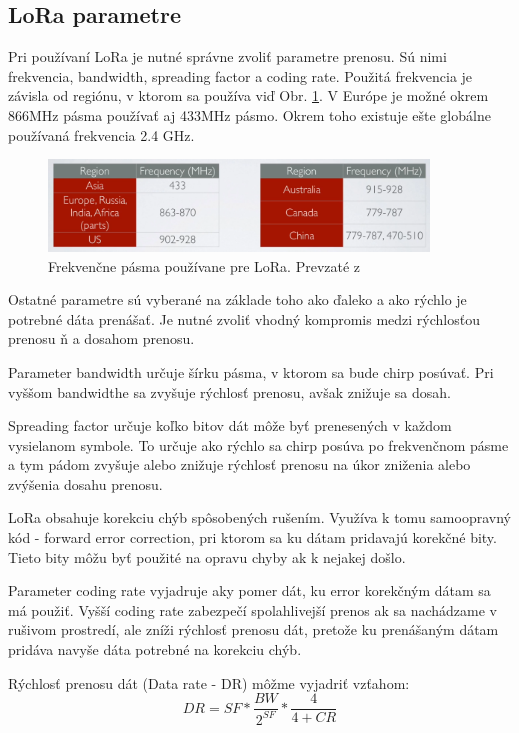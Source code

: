 \documentclass[slovak,master]{diploma}
\begin{document}
\subsection{LoRa parametre}
Pri používaní LoRa je nutné správne zvoliť parametre prenosu. Sú nimi frekvencia, bandwidth, spreading factor a coding rate.
Použitá frekvencia je závisla od regiónu, v ktorom sa používa viď Obr. \ref{fig:ismBands}. 
V Európe je možné okrem 866MHz pásma používať aj 433MHz pásmo. Okrem toho existuje ešte globálne používaná frekvencia 2.4 GHz.
\begin{figure}[h!]
	\centering
	\includegraphics[width=0.9\textwidth]{Figures/ism_bands.png}
	\caption{Frekvenčne pásma používane pre LoRa. Prevzaté z \cite{loraMod}}
	\label{fig:ismBands}
\end{figure}

Ostatné parametre sú vyberané na základe toho ako ďaleko a ako rýchlo je potrebné dáta prenášať. Je nutné zvoliť vhodný kompromis medzi rýchlosťou prenosu ň
a dosahom prenosu.

Parameter bandwidth určuje šírku pásma, v ktorom sa bude chirp posúvať. Pri vyššom bandwidthe sa zvyšuje rýchlosť prenosu, avšak znižuje sa dosah.

Spreading factor určuje koľko bitov dát môže byť prenesených v každom vysielanom symbole. To určuje ako rýchlo sa chirp posúva po frekvenčnom pásme a tym pádom 
zvyšuje alebo znižuje rýchlosť prenosu na úkor zniženia alebo zvýšenia dosahu prenosu.

LoRa obsahuje korekciu chýb spôsobených rušením. Využíva k tomu samoopravný kód - forward error correction, pri ktorom 
sa ku dátam pridavajú korekčné bity. Tieto bity môžu byť použité na opravu chyby ak k nejakej došlo.

Parameter coding rate vyjadruje aky pomer dát, ku error korekčným dátam sa má použiť. Vyšší coding rate zabezpečí spolahlivejší prenos ak 
sa nachádzame v rušivom prostredí, ale zníži rýchlosť prenosu dát, pretože ku prenášaným dátam pridáva navyše dáta potrebné na korekciu chýb.

Rýchlosť prenosu dát (Data rate - DR) môžme vyjadriť vzťahom:
\begin{equation}
  DR = SF * \frac{BW}{2^{SF}} * \frac{4}{4+CR}
\end{equation}
\end{document}
